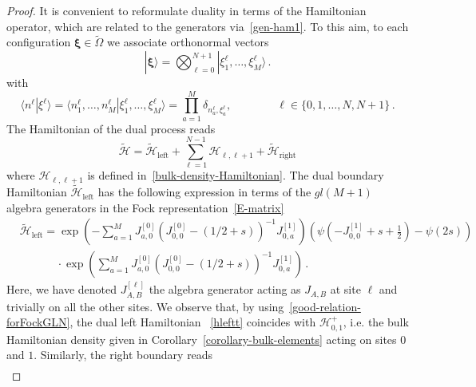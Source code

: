 \documentclass[11pt]{article}
\numberwithin{equation}{section}
\newcommand{\M}{M}
\newcommand{\N}{N}
\newcommand{\eH}{\mathcal{H}}
\newcommand{\eJ}{J}
\begin{document}
\begin{proof}
	It is convenient to reformulate duality in terms of the Hamiltonian operator, which are related to the generators via~\eqref{gen-ham1}. To this aim, to each configuration $\bm{\xi}\in \widetilde{\Omega}$ we associate orthonormal vectors
	\begin{equation}
		|\bm{\xi}\rangle =\bigotimes_{\ell=0}^{\N+1}|\xi_{1}^{\ell},\ldots,\xi_{\M}^{\ell}\rangle\,.
	\end{equation}
	with 
	\begin{equation}
		\langle n^{\ell}|\xi^{\ell}\rangle=\langle n_{1}^{\ell},\ldots,n_{\M}^{\ell}|\xi_{1}^{\ell},\ldots,\xi_{\M}^{\ell}\rangle=\prod_{a=1}^{\M}\delta_{n_{a}^{\ell},\xi_{a}^{\ell}}, \qquad \qquad \ell\in \{0,1,\ldots,\N,\N+1\}\,.
	\end{equation}
	The Hamiltonian of the dual process reads
	\begin{equation}\label{Hamiltonian-ABS-Harmonic}
		\widetilde{\eH}=\widetilde{\eH}_{\text{left}}+\sum_{\ell=1}^{\N-1}\eH_{\ell,\ell+1}+\widetilde{\eH}_{\text{right}}
	\end{equation}
	where $\eH_{\ell,\ell+1}$ is defined in~\eqref{bulk-density-Hamiltonian}. The dual boundary Hamiltonian  $\widetilde{\eH}_{\text{left}}$ 
		has the following expression in terms of the $gl(\M+1)$ algebra generators in the Fock representation~\eqref{E-matrix} 
		\begin{equation}\label{hleftt}
		\begin{split}
			&\widetilde{\eH}_{\text{left}}=\exp{\left(-\sum_{a=1}^{\M}\eJ_{a,0}^{[0]}\left(\eJ_{0,0}^{[0]}-\left(1/2+s\right)\right)^{-1}\eJ_{0,a}^{[1]}\right)}\left(\psi(-\eJ_{0,0}^{[1]}+s+\frac{1}{2})-\psi(2s)\right)
			\\&\;\qquad \quad\cdot
			\exp{\left(\sum_{a=1}^{\M}\eJ_{a,0}^{[0]}\left(\eJ_{0,0}^{[0]}-\left(1/2+s\right)\right)^{-1}\eJ_{0,a}^{[1]}\right)}\,.
		\end{split}
	\end{equation}
    Here, we have denoted $\eJ_{A,B}^{[\ell]}$ the algebra generator acting as $\eJ_{A,B}$ at site $\ell$ and trivially on all the other sites.
    We observe that, by using~\eqref{good-relation-forFockGLN}, the dual left Hamiltonian 
				  ~\eqref{hleftt} coincides with $\eH^{+}_{0,1}$, i.e. the bulk Hamiltonian density given in Corollary~\ref{corollary-bulk-elements} acting on sites $0$ and $1$.
    Similarly, the right boundary reads
    \begin{equation}\label{right-dual-hamiltonian}
    \begin{split}

\end{split}
\end{equation}
\end{proof}
\end{document}

